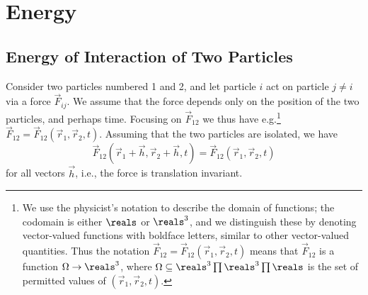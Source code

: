\documentclass[article, a4paper, 11pt, oneside]{memoir}
\numberwithin{equation}{chapter}
\begin{document}
\chapter{Energy}

\addtocounter{section}{8}

\section{Energy of Interaction of Two Particles}

Consider two particles numbered 1 and 2, and let particle $i$ act on particle $j \neq i$ via a force $\vec{F}_{ij}$. We assume that the force depends only on the position of the two particles, and perhaps time. Focusing on $\vec{F}_{12}$ we thus have e.g.\footnote{We use the physicist's notation to describe the domain of functions; the codomain is either $\reals$ or $\reals^3$, and we distinguish these by denoting vector-valued functions with boldface letters, similar to other vector-valued quantities. Thus the notation $\vec{F}_{12} = \vec{F}_{12}(\vec{r}_1, \vec{r}_2, t)$ means that $\vec{F}_{12}$ is a function $\Omega \to \reals^3$, where $\Omega \subseteq \reals^3 \prod \reals^3 \prod \reals$ is the set of permitted values of $(\vec{r}_1, \vec{r}_2, t)$.} $\vec{F}_{12} = \vec{F}_{12}(\vec{r}_1, \vec{r}_2, t)$. Assuming that the two particles are isolated, we have
%
\begin{equation*}
    \vec{F}_{12}(\vec{r}_1 + \vec{h}, \vec{r}_2 + \vec{h}, t)
    = \vec{F}_{12}(\vec{r}_1, \vec{r}_2, t)
\end{equation*}
%
for all vectors $\vec{h}$, i.e., the force is translation invariant.
\end{document}
